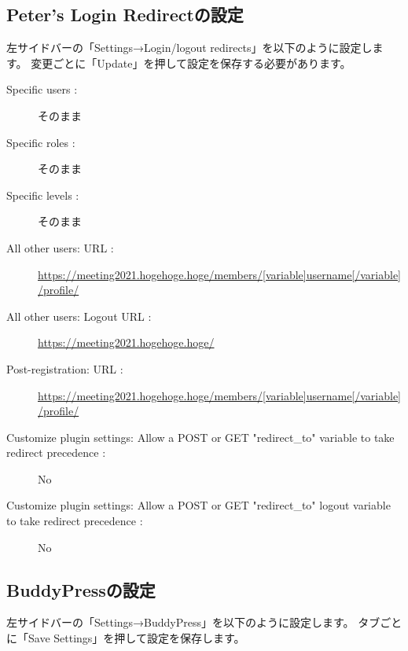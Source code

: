 \documentclass[titlepage,10pt,a4paper,uplatex]{jsbook}
\begin{document}
\subsection{Peter's Login Redirectの設定}

左サイドバーの「Settings→Login/logout redirects」を以下のように設定します。
変更ごとに「Update」を押して設定を保存する必要があります。

\begin{description}
\item[Specific users : ] そのまま
\item[Specific roles : ] そのまま
\item[Specific levels : ] そのまま
\item[All other users: URL : ] \url{https://meeting2021.hogehoge.hoge/members/[variable]username[/variable]/profile/}
\item[All other users: Logout URL : ] \url{https://meeting2021.hogehoge.hoge/}
\item[Post-registration: URL : ] \url{https://meeting2021.hogehoge.hoge/members/[variable]username[/variable]/profile/}
\item[Customize plugin settings: Allow a POST or GET "redirect\_to" variable to take redirect precedence : ] No
\item[Customize plugin settings: Allow a POST or GET "redirect\_to" logout variable to take redirect precedence : ] No
\end{description}

\subsection{BuddyPressの設定}

左サイドバーの「Settings→BuddyPress」を以下のように設定します。
タブごとに「Save Settings」を押して設定を保存します。
\end{document}
